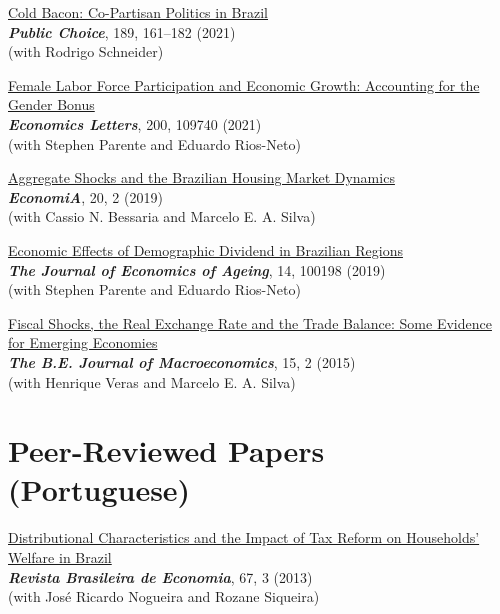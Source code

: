 \documentclass[mm, 10pt]{simple_style}
\begin{document}
\begin{resume}
\clearpage
\href{https://doi.org/10.1007/s11127-020-00869-4}{Cold Bacon: Co-Partisan Politics in Brazil} \\
\textbf{\textit{Public Choice}}, 189, 161–182 (2021) \\
(with Rodrigo Schneider) 

\href{https://doi.org/10.1016/j.econlet.2021.109740}{Female Labor Force Participation and Economic Growth: Accounting for the Gender Bonus}  \\
 \textbf{\textit{Economics Letters}}, 200, 109740 (2021)  \\ 
(with Stephen Parente and Eduardo Rios-Neto)

\href{https://doi.org/10.1016/j.econ.2019.08.001}{Aggregate Shocks and the Brazilian Housing Market Dynamics} \\
\textbf{\textit{EconomiA}}, 20, 2 (2019) \\
(with Cassio N. Bessaria and Marcelo E. A. Silva)

\href{https://doi.org/10.1016/j.jeoa.2019.100198}{Economic Effects of Demographic Dividend in Brazilian Regions} \\
\textbf{\textit{The Journal of Economics of Ageing}}, 14, 100198 (2019)  \\
(with Stephen Parente and Eduardo Rios-Neto)

\href{https://doi.org/10.1515/bejm-2014-0018}{Fiscal Shocks, the Real Exchange Rate and the Trade Balance: Some Evidence for Emerging Economies} \\
\textbf{\textit{The B.E. Journal of Macroeconomics}}, 15, 2 (2015)  \\
(with Henrique Veras and Marcelo E. A. Silva)


\section{Peer-Reviewed Papers\\ (Portuguese)}

\href{http://bibliotecadigital.fgv.br/ojs/index.php/rbe/article/view/6159}{Distributional Characteristics and the Impact of Tax Reform on Households’ Welfare in Brazil}  \\
\textbf{\textit{Revista Brasileira de Economia}}, 67, 3 (2013) \\
(with Jos\'e Ricardo Nogueira and Rozane Siqueira) 



\end{resume}
\end{document}
